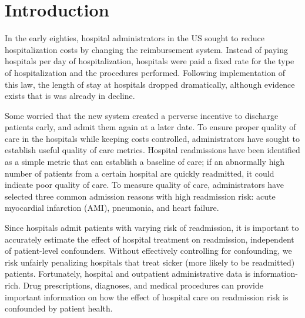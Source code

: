 \documentclass[]{article}\usepackage[]{graphicx}\usepackage[]{color}
\begin{document}
\section{Introduction}
In the early eighties, hospital administrators in the US sought to reduce hospitalization costs by changing the reimbursement system. Instead of paying hospitals per day of hospitalization, hospitals were paid a fixed rate for the type of hospitalization and the procedures performed.\supercite{iglehart_medicare_1983} Following implementation of this law, the length of stay at hospitals dropped dramatically, although evidence exists that is was already in decline.\supercite{gornick_medicare_1977}

Some worried that the new system created a perverse incentive to discharge patients early, and admit them again at a later date.\supercite{anderson_hospital_1984} To ensure proper quality of care in the hospitals while keeping costs controlled, administrators have sought to establish useful quality of care metrics.\supercite{institute_of_medicine_u.s.._division_of_health_care_services_medicare_1990} Hospital readmissions have been identified as a simple metric that can establish a baseline of care; if an abnormally high number of patients from a certain hospital are quickly readmitted, it could indicate poor quality of care. To measure quality of care, administrators have selected three common admission reasons with high readmission risk: acute myocardial infarction (AMI), pneumonia, and heart failure.\supercite{us_government_public_2012}

Since hospitals admit patients with varying risk of readmission, it is important to accurately estimate the effect of hospital treatment on readmission, independent of patient-level confounders. Without effectively controlling for confounding, we risk unfairly penalizing hospitals that treat sicker (more likely to be readmitted) patients. Fortunately, hospital and outpatient administrative data is information-rich. Drug prescriptions, diagnoses, and medical procedures can provide important information on how the effect of hospital care on readmission risk is confounded by patient health.
\end{document}
